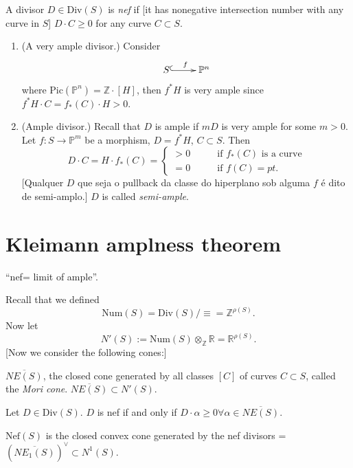 \medskip\noindent
\begin{definition}
\label{definition-positive}
A divisor $D \in \text{Div}(S)$
is {\it nef} if [it has nonegative
intersection number with
any curve in $S$] $D\cdot C \geq 0$ for any
curve $C \subset S$.
\end{definition}

\begin{example}
\label{example-positive-divisors}
\begin{enumerate}
\item (A very ample divisor.) Consider
$$
\xymatrix{
S \ar@{^{(}->}[r]^f
&\mathbb{P}^n
}
$$
where
$\text{Pic}(\mathbb{P}^n)=\mathbb{Z}\cdot[H]
$,
then $f^*H$ is very ample since
$f^*H\cdot C = f_*(C)\cdot H >0$.

\item (Ample divisor.) Recall that $D$ is
ample if $mD$
is very ample for some $m>0$.
Let $f:S \to \mathbb{P}^m$ be a morphism,
$D= f^* H$, $C \subset S$.
Then
$$
D\cdot C
=H \cdot f_\ast(C)
=
\begin{cases}
>0\qquad &\text{if }f_*(C)\text{ is a curve}
\\
=0\qquad &\text{if }f(C) = pt.
\end{cases}
$$
[Qualquer $D$ que seja o pullback da classe
do hiperplano
sob alguma $f$ é dito de semi-amplo.]
$D$ is called {\it semi-ample}.
\end{enumerate}
\end{example}

\section{Kleimann amplness theorem}
\label{section-kleimann}

\noindent
``nef= limit of ample''.

\medskip\noindent
Recall that we defined
$$
\text{Num}(S) = \text{Div}(S)/\equiv =
\mathbb{Z}^{\rho(S)}.
$$
Now let
$$
N'(S):= \text{Num}(S)
\otimes_{\mathbb{Z}}\mathbb{R}=\mathbb{R}
^{\rho(S)}.
$$
[Now we consider the following cones:]

$\overline{NE(S)}$,
the closed cone generated by all classes
$[C]$ of curves $C \subset S$,
called the {\it Mori cone}.
$\overline{NE(S)}\subset N'(S)$.

Let
$D \in \text{Div}(S)$.
$D$ is nef if and only if
$D\cdot\alpha \geq 0\forall \alpha \in
\overline{NE(S)}$.

$\text{Nef}(S)$ is the closed convex cone
generated by
the nef divisors = $(\overline{NE_1(S)})^\vee
\subset N^1(S)$.


